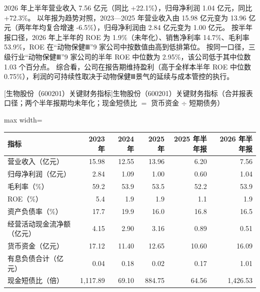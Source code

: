  2026 年上半年营业收入 7.56 亿元（同比 +22.1\%），归母净利润 1.04 亿元，同比 +72.3\%。 以年报为趋势对照，2023---2025 年营业收入由 15.98 亿元变为 13.96 亿元（两年年均复合增速 -6.5\%），归母净利润由 2.84 亿元变为 1.00 亿元。 按半年报口径，2026 年上半年的 ROE 为 1.9\%（未年化）、销售净利率 14.7\%、毛利率 53.9\%，ROE 在“动物保健Ⅲ”9 家公司中按数值由高到低排第位。 按同一口径，三级行业“动物保健Ⅲ”9 家公司的半年 ROE 中位数为 2.95\%，该公司低于其中位数 1.03 个百分点。 综合看，公司在报告期维持盈利（高于全样本半年 ROE 中位数 0.75\%），利润的可持续性取决于动物保健Ⅲ景气的延续与成本管控的执行。

\begin{center}\small\setlength{\tabcolsep}{3.4pt}
[生物股份（600201）关键财务指标]{生物股份（600201）关键财务指标（合并报表口径；两个半年报期均未年化；现金短债比 $=$ 货币资金 $\div$ 短期债务）}
\begin{adjustbox}{max width=\textwidth}
\begin{tabular}{@{}lrrrrr@{}}
\toprule
指标 & 2023 年 & 2024 年 & 2025 年 & 2025 年半年报 & 2026 年半年报 \\
\midrule
营业收入（亿元） & 15.98 & 12.55 & 13.96 & 6.20 & 7.56 \\
归母净利润（亿元） & 2.84 & 1.09 & 1.00 & 0.60 & 1.04 \\
毛利率（\%） & 59.2 & 53.9 & 53.5 & 52.2 & 53.9 \\
ROE（\%） & 5.4 & 1.9 & 1.9 & 1.1 & 1.9 \\
资产负债率（\%） & 17.7 & 19.9 & 16.0 & 16.8 & 16.5 \\
经营活动现金流净额（亿元） & 4.15 & 2.90 & 3.16 & 0.89 & 0.51 \\
货币资金（亿元） & 17.12 & 11.40 & 12.65 & 10.60 & 16.09 \\
有息负债合计（亿元） & 0.04 & 0.18 & 0.02 & 0.17 & 1.01 \\
现金短债比（倍） & 1,117.89 & 69.10 & 884.75 & 64.56 & 1,426.53 \\
\bottomrule
\end{tabular}
\end{adjustbox}
\end{center}

